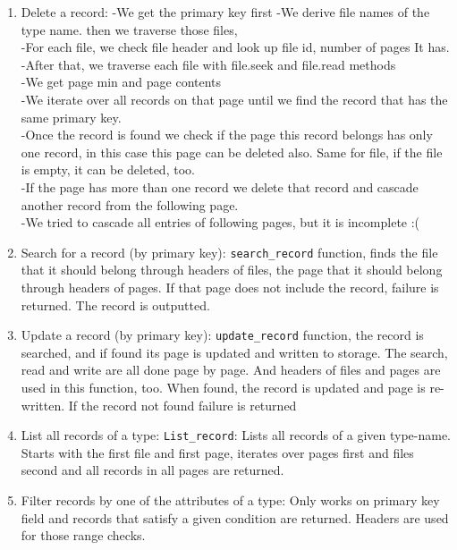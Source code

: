 \documentclass{article}
\begin{document}
\begin{enumerate}
    \item Delete a record: -We get the primary key first
-We derive file names of the type name. then we traverse those files,\\
-For each file, we check file header and look up file id, number of pages It has. \\
-After that, we traverse each file with file.seek and file.read methods\\
-We get page min and page contents\\
-We iterate over all records on that page until we find the record that has the same primary key.\\
-Once the record is found we check if the page this record belongs has only one record, in this case this page can be deleted also. Same for file, if the file is empty, it can be deleted, too.\\
-If the page has more than one record we delete that record and cascade another record from the following page. \\
-We tried to cascade all entries of following pages, but it is incomplete :(

    \item Search for a record (by primary key): \texttt{search\_record} function, finds the file that it should belong through headers of files, the page that it should belong through headers of pages. If that page does not include the record, failure is returned. The record is outputted.
    \item Update a record (by primary
key): \texttt{update\_record} function, the record is searched, and if found its page is updated and written to storage. The search, read and write are all done page by page. And headers of files and pages are used in this function, too. When found, the record is updated and page is re-written. If the record not found failure is returned
    \item List all records of a type: \texttt{List\_record}: Lists all records of a given type-name. Starts with the first file and first page, iterates over pages first and files second and all records in all pages are returned.
    \item Filter records by one of the attributes of a type: Only works on primary key field and records that satisfy a given condition are returned. Headers are used for those range checks.
\end{enumerate}
\end{document}
